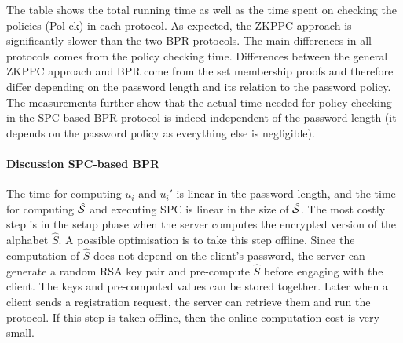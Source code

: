 The table shows the total running time as well as the time spent on checking the policies (Pol-ck) in each protocol. 
As expected, the \ac{ZKPPC} approach is significantly slower than the two \ac{BPR} protocols.
The main differences in all protocols comes from the policy checking time.
Differences between the general \ac{ZKPPC} approach and \ac{BPR} come from the set membership proofs and therefore differ depending on the password length and its relation to the password policy. 
The measurements further show that the actual time needed for policy checking in the \ac{SPC}-based \ac{BPR} protocol is indeed independent of the password length (it depends on the password policy as everything else is negligible).



\paragraph{Discussion SPC-based BPR}
The time for computing $u_i$ and $u_i'$ is linear in the password length, and the time for computing $\hat{\mathcal{S}}$ and executing \ac{SPC} is linear in the size of $\hat{\mathcal{S}}$. 
The most costly step is in the setup phase when the server computes the encrypted version of the alphabet $\hat{S}$.
A possible optimisation is to take this step offline. 
Since the computation of $\hat{S}$ does not depend on the client's password, the server can generate a random RSA key pair and pre-compute $\hat{S}$ before engaging with the client. 
The keys and pre-computed values can be stored together. 
Later when a client sends a registration request, the server can retrieve them and run the protocol. 
If this step is taken offline, then the online computation cost is very small.
